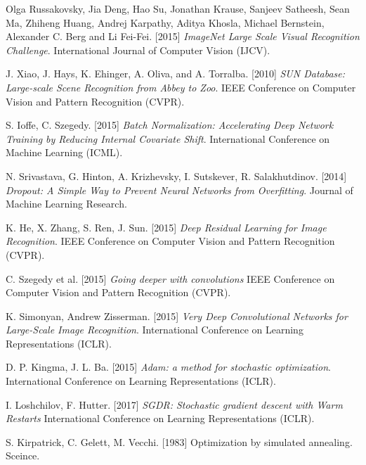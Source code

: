 \begin{thebibliography}{99}

	\bigskip
	
	Olga Russakovsky, Jia Deng, Hao Su, Jonathan Krause, Sanjeev Satheesh, 
	Sean Ma, Zhiheng Huang, Andrej Karpathy, Aditya Khosla, Michael Bernstein, 
	Alexander C. Berg and Li Fei-Fei. [2015]
	\textit{ImageNet Large Scale Visual Recognition Challenge}. 
	International Journal of Computer Vision (IJCV).
	 
	 J. Xiao, J. Hays, K. Ehinger, A. Oliva, and A. Torralba. [2010]
	 \textit{SUN Database: Large-scale Scene Recognition from Abbey to Zoo}.
	 IEEE Conference on Computer Vision and Pattern Recognition (CVPR).
	 
	 S. Ioffe, C. Szegedy. [2015]
	 \textit{Batch Normalization: Accelerating Deep Network Training by 
	 Reducing Internal Covariate Shift}. 
	 International Conference on Machine Learning (ICML).
	 
	 N. Srivastava, G. Hinton, A. Krizhevsky, I. Sutskever, R. Salakhutdinov. [2014]
	 \textit{Dropout: A Simple Way to Prevent Neural Networks from Overfitting}.
	 Journal of Machine Learning Research.
	 
	 K. He, X. Zhang, S. Ren, J. Sun. [2015]
	 \textit{Deep Residual Learning for Image Recognition}.
	 IEEE Conference on Computer Vision and Pattern Recognition (CVPR).
	 
	 C. Szegedy et al. [2015]
	 \textit{Going deeper with convolutions}
	 IEEE Conference on Computer Vision and Pattern Recognition (CVPR).
	 
	 K. Simonyan, Andrew Zisserman. [2015]
	 \textit{Very Deep Convolutional Networks for Large-Scale Image Recognition}.
	 International Conference on Learning Representations (ICLR).
	 
	 D. P. Kingma, J. L. Ba. [2015]
	 \textit{Adam: a method for stochastic optimization}.
	 International Conference on Learning Representations (ICLR).
	 
	 I. Loshchilov, F. Hutter. [2017]
	 \textit{SGDR: Stochastic gradient descent with Warm Restarts}
	 International Conference on Learning Representations (ICLR).
	 	 
	 S. Kirpatrick, C. Gelett, M. Vecchi. [1983]
	 Optimization by simulated annealing.
	 Sceince.
	 

\end{thebibliography}
